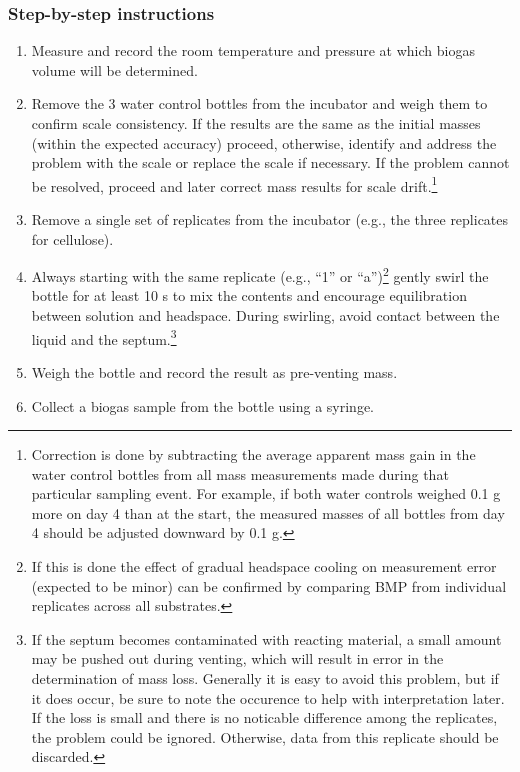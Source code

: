 \documentclass[]{article}
\begin{document}
\subsubsection{Step-by-step instructions}
\begin{enumerate}
    \item Measure and record the room temperature and pressure at which biogas volume will be determined.
    \item Remove the 3 water control bottles from the incubator and weigh them to confirm scale consistency. 
      If the results are the same as the initial masses (within the expected accuracy) proceed, otherwise, identify and address the problem with the scale or replace the scale if necessary.
      If the problem cannot be resolved, proceed and later correct mass results for scale drift.\footnote{
        Correction is done by subtracting the average apparent mass gain in the water control bottles from all mass measurements made during that particular sampling event. 
        For example, if both water controls weighed 0.1 g more on day 4 than at the start, the measured masses of all bottles from day 4 should be adjusted downward by 0.1 g.
      }
    \item Remove a single set of replicates from the incubator (e.g., the three replicates for cellulose).
    \item Always starting with the same replicate (e.g., ``1'' or ``a'')\footnote{
        If this is done the effect of gradual headspace cooling on measurement error (expected to be minor) can be confirmed by comparing BMP from individual replicates across all substrates.
      } gently swirl the bottle for at least 10 s to mix the contents and encourage  equilibration between solution and headspace. 
      During swirling, avoid contact between the liquid and the septum.\footnote{
        If the septum becomes contaminated with reacting material, a small amount may be pushed out during venting, which will result in error in the determination of mass loss.
        Generally it is easy to avoid this problem, but if it does occur, be sure to note the occurence to help with interpretation later.
        If the loss is small and there is no noticable difference among the replicates, the problem could be ignored. 
        Otherwise, data from this replicate should be discarded.
      }
    \item Weigh the bottle and record the result as pre-venting mass.
    \item Collect a biogas sample from the bottle using a syringe. 

\end{enumerate}
\end{document}
